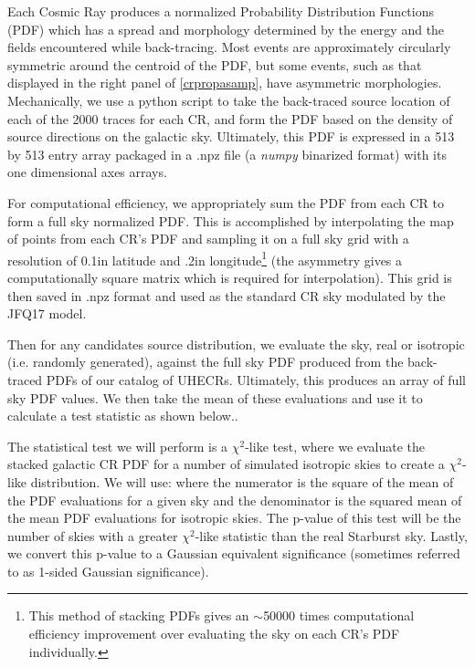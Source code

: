 Each Cosmic Ray produces a normalized Probability Distribution Functions (PDF) which has a spread and morphology determined by the energy and the fields encountered while back-tracing. Most events are approximately circularly symmetric around the centroid of the PDF, but some events, such as that displayed in the right panel of \autoref{crpropasamp}, have asymmetric morphologies. Mechanically, we use a python script to take the back-traced source location of each of the 2000 traces for each CR, and form the PDF based on the density of source directions on the galactic sky. Ultimately, this PDF is expressed in a 513 by 513 entry array packaged in a .npz file (a \textit{numpy} binarized format) with its one dimensional axes arrays. 

For computational efficiency, we appropriately sum the PDF from each CR to form a full sky normalized PDF. This is accomplished by interpolating the map of points from each CR's PDF and sampling it on a full sky grid with a resolution of 0.1\degree in latitude and .2\degree in longitude\footnote{This method of stacking PDFs gives an $\sim$50000 times computational efficiency improvement over evaluating the sky on each CR's PDF individually.} (the asymmetry gives a computationally square matrix which is required for interpolation). This grid is then saved in .npz format and used as the standard CR sky modulated by the JFQ17 model. 

Then for any candidates source distribution, we evaluate the sky, real or isotropic (i.e. randomly generated), against the full sky PDF produced from the back-traced PDFs of our catalog of UHECRs. Ultimately, this produces an array of full sky PDF values. We then take the mean of these evaluations and use it to calculate a test statistic as shown below.. 

The statistical test we will perform is a $\chi^2$-like test, where we evaluate the stacked galactic CR PDF for a number of simulated isotropic skies to create a $\chi^2$-like distribution. We will use:
where the numerator is the square of the mean of the PDF evaluations for a given sky and the denominator is the squared mean of the mean PDF evaluations for isotropic skies. The p-value of this test will be the number of skies with a greater $\chi^2$-like statistic than the real Starburst sky. Lastly, we convert this p-value to a Gaussian equivalent significance (sometimes referred to as 1-sided Gaussian significance). 

